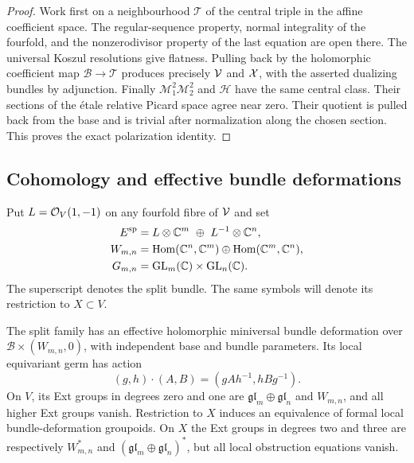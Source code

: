 \begin{proof}
Work first on a neighbourhood $\mathcal T$ of the central triple
in the affine coefficient space. The regular-sequence property,
normal integrality of the fourfold, and the nonzerodivisor
property of the last equation are open there. The universal
Koszul resolutions give flatness. Pulling back by the
holomorphic coefficient map $\mathcal B\to\mathcal T$ produces
precisely $\mathcal V$ and $\mathcal X$, with the asserted dualizing bundles
by adjunction. Finally $\mathcal M_1^2\mathcal M_2^2$ and
$\mathcal H$ have the same central class. Their sections of the
étale relative Picard space agree near zero. Their quotient is
pulled back from the base and is trivial after normalization
along the chosen section. This proves the exact polarization
identity.
\end{proof}

\subsection{Cohomology and effective bundle deformations}

Put $L=\mathcal O_V(1,-1)$ on any fourfold fibre of $\mathcal V$ and set
\[
 \begin{aligned}
 E^{\rm sp}&=L\otimes\mathbb C^m\ \oplus\ L^{-1}\otimes\mathbb C^n,\\
 W_{m,n}&=\operatorname{Hom}(\mathbb C^n,\mathbb C^m)\oplus\operatorname{Hom}(\mathbb C^m,\mathbb C^n),\\
 G_{m,n}&=\operatorname{GL}_m(\mathbb C)\times\operatorname{GL}_n(\mathbb C).
 \end{aligned}
\]
The superscript denotes the split bundle. The same symbols
will denote its restriction to $X\subset V$.

\begin{proposition}\label{prop:effective-bundles}
The split family has an effective holomorphic miniversal
bundle deformation over $\mathcal B\times(W_{m,n},0)$, with
independent base and bundle parameters. Its local equivariant
germ has action
\begin{equation}\label{eq:two-arrow-action}
 (g,h)\cdot(A,B)=(gAh^{-1},hBg^{-1}).
\end{equation}
On $V$, its Ext groups in degrees zero and one are
$\mathfrak{gl}_m\oplus\mathfrak{gl}_n$ and $W_{m,n}$,
and all higher Ext groups vanish. Restriction to $X$ induces
an equivalence of formal local bundle-deformation groupoids.
On $X$ the Ext groups in degrees two and three are respectively
$W_{m,n}^*$ and $(\mathfrak{gl}_m\oplus\mathfrak{gl}_n)^*$,
but all local obstruction equations vanish.
\end{proposition}

